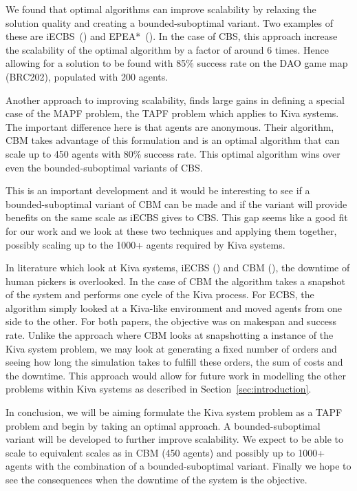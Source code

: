 \documentclass[a4paper,11pt]{article}
\begin{document}
We found that optimal algorithms can improve scalability by relaxing the solution quality and creating a bounded-suboptimal variant. Two examples of these are iECBS~(\cite{cohen2016improved}) and EPEA*~(\cite{goldenberg2014enhanced}). In the case of CBS, this approach increase the scalability of the optimal algorithm by a factor of around 6 times. Hence allowing for a solution to be found with 85\% success rate on the DAO game map (BRC202), populated with 200 agents.

Another approach to improving scalability, \cite{ma2016optimal} finds large gains in defining a special case of the MAPF problem, the TAPF problem which applies to Kiva systems. The important difference here is that agents are anonymous. Their algorithm, CBM takes advantage of this formulation and is an optimal algorithm that can scale up to 450 agents with 80\% success rate. This optimal algorithm wins over even the bounded-suboptimal variants of CBS. 

This is an important development and it would be interesting to see if a bounded-suboptimal variant of CBM can be made and if the variant will provide benefits on the same scale as iECBS gives to CBS.  This gap seems like a good fit for our work and we look at these two techniques and applying them together, possibly scaling up to the 1000+ agents required by Kiva systems.

In literature which look at Kiva systems, iECBS (\cite{cohen2016improved})  and CBM (\cite{ma2016optimal}), the downtime of human pickers is overlooked. In the case of CBM the algorithm takes a snapshot of the system and performs one cycle of the Kiva process. For ECBS, the algorithm simply looked at a Kiva-like environment and moved agents from one side to the other. For both papers, the objective was on makespan and success rate. Unlike the approach where CBM looks at snapshotting a instance of the Kiva system problem, we may look at generating a fixed number of orders and seeing how long the simulation takes to fulfill these orders, the sum of costs and the downtime. This approach would allow for future work in modelling the other problems within Kiva systems as described in Section~\ref{sec:introduction}.

In conclusion, we will be aiming formulate the Kiva system problem as a TAPF problem and begin by taking an optimal approach. A bounded-suboptimal variant will be developed to further improve scalability. We expect to be able to scale to equivalent scales as in CBM (450 agents) and possibly up to 1000+ agents with the combination of a bounded-suboptimal variant. Finally we hope to see the consequences when the downtime of the system is the objective.
\end{document}
